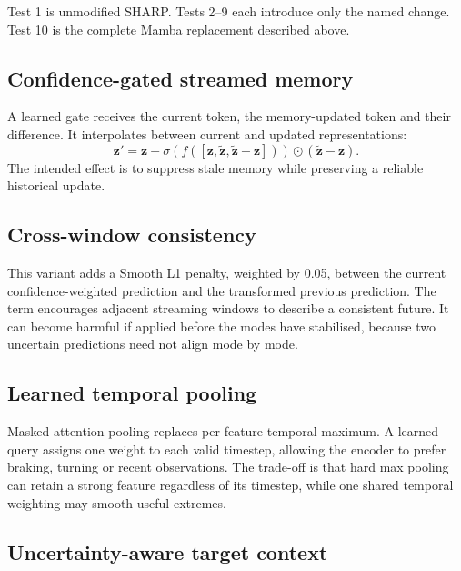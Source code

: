 Test 1 is unmodified SHARP. Tests 2--9 each introduce only the named change. Test 10 is the complete Mamba replacement described above.

\subsection{Confidence-gated streamed memory}

A learned gate receives the current token, the memory-updated token and their difference. It interpolates between current and updated representations:
\begin{equation}
    \mathbf{z}'=\mathbf{z}+\sigma(f([\mathbf{z},\tilde{\mathbf{z}},
    \tilde{\mathbf{z}}-\mathbf{z}]))\odot(\tilde{\mathbf{z}}-\mathbf{z}).
\end{equation}
The intended effect is to suppress stale memory while preserving a reliable historical update.

\subsection{Cross-window consistency}

This variant adds a Smooth L1 penalty, weighted by 0.05, between the current confidence-weighted prediction and the transformed previous prediction. The term encourages adjacent streaming windows to describe a consistent future. It can become harmful if applied before the modes have stabilised, because two uncertain predictions need not align mode by mode.

\subsection{Learned temporal pooling}

Masked attention pooling replaces per-feature temporal maximum. A learned query assigns one weight to each valid timestep, allowing the encoder to prefer braking, turning or recent observations. The trade-off is that hard max pooling can retain a strong feature regardless of its timestep, while one shared temporal weighting may smooth useful extremes.

\subsection{Uncertainty-aware target context}

